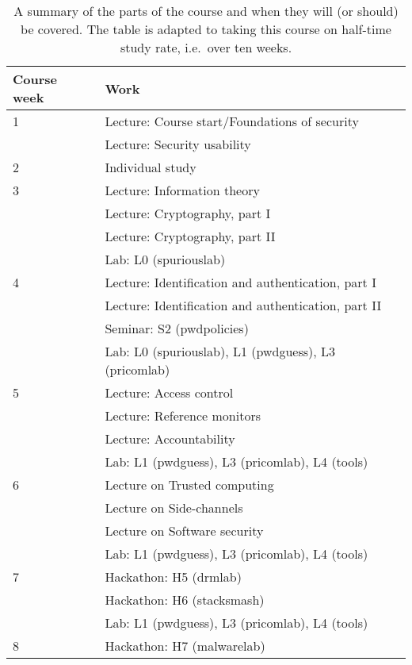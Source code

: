 \begin{table}
	\centering
  \caption{%
    A summary of the parts of the course and when they will (or should) be 
    covered.
    The table is adapted to taking this course on half-time study rate, i.e.\ 
    over ten weeks.
  }\label{TimeTable}
  \begin{tabular}{lp{9cm}}
    \toprule
    \textbf{Course week}	& \textbf{Work} \\
    \midrule
    1
    & Lecture: Course start/Foundations of security\\
    & Lecture: Security usability\\
    \midrule
    2
    & Individual study\\
    \midrule
    3
    & Lecture: Information theory\\
    & Lecture: Cryptography, part I\\
    & Lecture: Cryptography, part II\\
    & Lab: L0 (spuriouslab)\\
    \midrule
    4
    & Lecture: Identification and authentication, part I\\
    & Lecture: Identification and authentication, part II\\
    & Seminar: S2 (pwdpolicies)\\
    & Lab: L0 (spuriouslab), L1 (pwdguess), L3 (pricomlab)\\
    \midrule
    5
    & Lecture: Access control\\
    & Lecture: Reference monitors\\
    & Lecture: Accountability\\
    & Lab: L1 (pwdguess), L3 (pricomlab), L4 (tools)\\
    \midrule
    6
    & Lecture on Trusted computing\\
    & Lecture on Side-channels\\
    & Lecture on Software security\\
    & Lab: L1 (pwdguess), L3 (pricomlab), L4 (tools)\\
    \midrule
    7
    & Hackathon: H5 (drmlab)\\
    & Hackathon: H6 (stacksmash)\\
    & Lab: L1 (pwdguess), L3 (pricomlab), L4 (tools)\\
    \midrule
    8
    & Hackathon: H7 (malwarelab)\\

\end{tabular}
\end{table}
